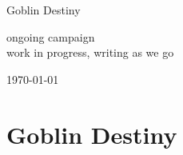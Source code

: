 







\pagestyle{empty}

\begin{center}
\huge
Goblin Destiny

\vspace{2cm}

\normalsize
ongoing campaign\\
work in progress, writing as we go\\

\vfill

\today

\end{center}






\cleardoublepage
\pagestyle{fancy}



\setcounter{page}{1}




\section*{Goblin Destiny}

